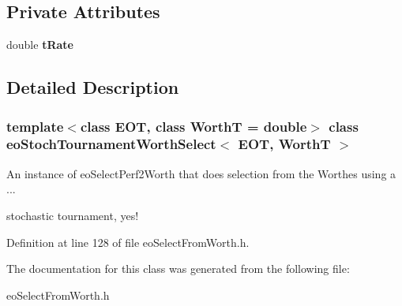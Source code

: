 \subsection*{Private Attributes}
\begin{CompactItemize}
\item 
double {\bf t\-Rate}\label{classeo_stoch_tournament_worth_select_r0}

\end{CompactItemize}


\subsection{Detailed Description}
\subsubsection*{template$<$class EOT, class Worth\-T = double$>$ class eo\-Stoch\-Tournament\-Worth\-Select$<$ EOT, Worth\-T $>$}

An instance of eo\-Select\-Perf2Worth that does selection from the Worthes using a ... 

stochastic tournament, yes! 



Definition at line 128 of file eo\-Select\-From\-Worth.h.

The documentation for this class was generated from the following file:\begin{CompactItemize}
\item 
eo\-Select\-From\-Worth.h\end{CompactItemize}
